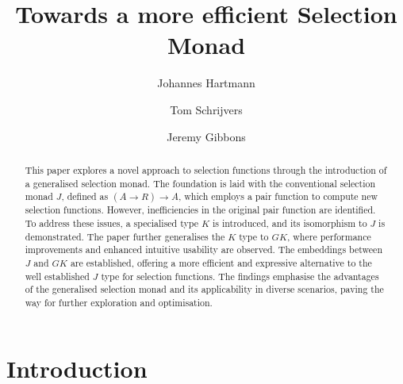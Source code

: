 \documentclass[runningheads]{llncs}
\newcommand{\ignore}[1]{}
\begin{document}
\title{Towards a more efficient Selection Monad}

\author{
    Johannes Hartmann \and 
    Tom Schrijvers\and 
    Jeremy Gibbons
}
%


%
\maketitle              %
%
\begin{abstract}
This paper explores a novel approach to selection functions through the
introduction of a generalised selection monad. The foundation is laid
with the conventional selection monad \(J\), defined as
\((A \rightarrow R) \rightarrow A\), which employs a pair function to
compute new selection functions. However, inefficiencies in the original
pair function are identified. To address these issues, a specialised
type \(K\) is introduced, and its isomorphism to \(J\) is demonstrated.
The paper further generalises the \(K\) type to \(GK\), where
performance improvements and enhanced intuitive usability are observed.
The embeddings between \(J\) and \(GK\) are established, offering a more
efficient and expressive alternative to the well established \(J\) type
for selection functions. The findings emphasise the advantages of the
generalised selection monad and its applicability in diverse scenarios,
paving the way for further exploration and optimisation.

\end{abstract}
%
%
%
\ignore{

> {-# LANGUAGE ImpredicativeTypes #-}
> {-# LANGUAGE ScopedTypeVariables #-}

> import Prelude hiding ((>>=), return, pure, (<*>), fmap, sequence, pred)
> import Data.Function (on)
> import Data.List
> import Debug.Trace  

}

\section{Introduction}\label{introduction}
\end{document}
